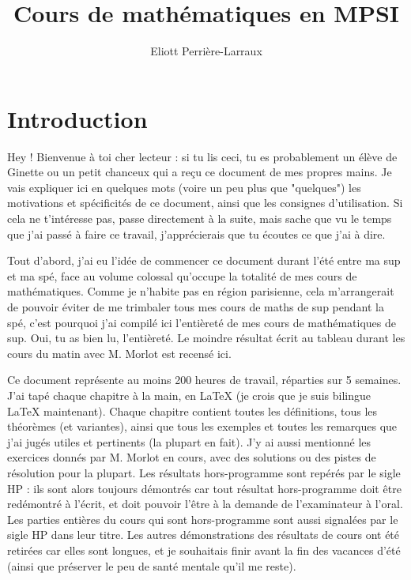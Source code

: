 \documentclass[french]{book}
\title{Cours de mathématiques en MPSI}
\author{Eliott Perrière-Larraux}
\theoremstyle{plain}
\theoremstyle{definition}
\theoremstyle{remark}
\begin{document}
\frontmatter
\maketitle
\chapter{Introduction}
Hey ! Bienvenue à toi cher lecteur : si tu lis ceci, tu es probablement un élève de Ginette ou un petit chanceux qui a reçu ce document de mes propres mains. Je vais expliquer ici en quelques mots (voire un peu plus que "quelques") les motivations et spécificités de ce document, ainsi que les consignes d'utilisation. Si cela ne t'intéresse pas, passe directement à la suite, mais sache que vu le temps que j'ai passé à faire ce travail, j'apprécierais que tu écoutes ce que j'ai à dire. \\
\par Tout d'abord, j'ai eu l'idée de commencer ce document durant l'été entre ma sup et ma spé, face au volume colossal qu'occupe la totalité de mes cours de mathématiques. Comme je n'habite pas en région parisienne, cela m'arrangerait de pouvoir éviter de me trimbaler tous mes cours de maths de sup pendant la spé, c'est pourquoi j'ai compilé ici l'entièreté de mes cours de mathématiques de sup. Oui, tu as bien lu, l'entièreté. Le moindre résultat écrit au tableau durant les cours du matin avec M. Morlot est recensé ici. \\
\par Ce document représente au moins 200 heures de travail, réparties sur 5 semaines. J'ai tapé chaque chapitre à la main, en LaTeX (je crois que je suis bilingue LaTeX maintenant). Chaque chapitre contient toutes les définitions, tous les théorèmes (et variantes), ainsi que tous les exemples et toutes les remarques que j'ai jugés utiles et pertinents (la plupart en fait). J'y ai aussi mentionné les exercices donnés par M. Morlot en cours, avec des solutions ou des pistes de résolution pour la plupart. Les résultats hors-programme sont repérés par le sigle HP : ils sont alors toujours démontrés car tout résultat hors-programme doit être redémontré à l'écrit, et doit pouvoir l'être à la demande de l'examinateur à l'oral. Les parties entières du cours qui sont hors-programme sont aussi signalées par le sigle HP dans leur titre. Les autres démonstrations des résultats de cours ont été retirées car elles sont longues, et je souhaitais finir avant la fin des vacances d'été (ainsi que préserver le peu de santé mentale qu'il me reste). \\ 
\end{document}
